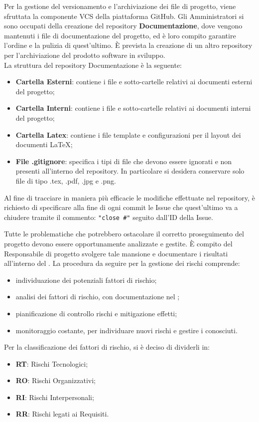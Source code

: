 			Per la gestione del versionamento e l'archiviazione dei file di progetto, viene sfruttata la componente VCS della piattaforma GitHub. Gli Amministratori si sono occupati della creazione del repository \textbf{Documentazione}, dove vengono mantenuti i file di documentazione del progetto, ed è loro compito garantire l'ordine e la pulizia di quest'ultimo. È prevista la creazione di un altro repository per l'archiviazione del prodotto software in sviluppo. \\
			La struttura del repository Documentazione è la seguente:
			\begin{itemize}
				\item \textbf{Cartella Esterni}: contiene i file e sotto-cartelle relativi ai documenti esterni del progetto;
				\item \textbf{Cartella Interni}: contiene i file e sotto-cartelle relativi ai documenti interni del progetto;
				\item \textbf{Cartella Latex}: contiene i file template e configurazioni per il layout dei documenti \LaTeX{};
				\item \textbf{File .gitignore}: specifica i tipi di file che devono essere ignorati e non presenti all'interno del repository. In particolare si desidera conservare solo file di tipo .tex, .pdf, .jpg e .png.
			\end{itemize}
			Al fine di tracciare in maniera più efficacie le modifiche effettuate nel repository, è richiesto di specificare alla fine di ogni commit le Issue che quest'ultimo va a chiudere tramite il commento: \texttt{"close \#"} seguito dall'ID della Issue.
			
			
			Tutte le problematiche che potrebbero ostacolare il corretto proseguimento del progetto devono essere opportunamente analizzate e gestite. È compito del Responsabile di progetto svolgere tale mansione e documentare i risultati all'interno del \PdP{}. La procedura da seguire per la gestione dei rischi comprende:
			\begin{itemize}
				\item individuazione dei potenziali fattori di rischio;
				\item analisi dei fattori di rischio, con documentazione nel \PdP{};
				\item pianificazione di controllo rischi e mitigazione effetti;
				\item monitoraggio costante, per individuare nuovi rischi e gestire i conosciuti.
			\end{itemize}
			Per la classificazione dei fattori di rischio, si è deciso di dividerli in:
			\begin{itemize}
				\item \textbf{RT}: Rischi Tecnologici;
				\item \textbf{RO}: Rischi Organizzativi;
				\item \textbf{RI}: Rischi Interpersonali;
				\item \textbf{RR}: Rischi legati ai Requisiti.
			\end{itemize}
